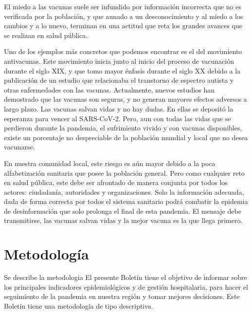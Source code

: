 \documentclass[12pt,a4paper,openany]{book}
\begin{document}
	El miedo a las vacunas suele ser infundido por información incorrecta que no es verificada por la población, y que aunado a un desconocimiento y al  miedo a los cambios y a lo nuevo, terminan en una actitud que reta los grandes avances que se realizan en salud pública.
	
	Uno de los ejemplos más concretos que podemos encontrar es el del movimiento antivacunas. Este movimiento inicia junto al inicio del proceso de vacunación durante el siglo XIX, y que tomo mayor énfasis durante el siglo XX debido a la publicación de un estudio que relacionaba el transtorno de espectro autista y otras enfermedades con las vacunas. Actualmente, nuevos estudios han demostrado que las vacunas son seguras, y no generan mayores efectos adversos a largo plazo.  Las vacunas salvan vidas y no hay dudas. En ellas se depositó la esperanza para vencer al SARS-CoV-2. Pero, aun con todas las vidas que se perdieron durante la pandemia, el sufrimiento vivido  y  con vacunas disponibles, existe un porcentaje no despreciable de la población mundial y local que no desea vacunarse. 
	
	
	En nuestra comunidad local, este riesgo es aún mayor debido a la poca alfabetización sanitaria que posee la población general. Pero como cualquier reto en salud pública, este debe ser afrontado de manera conjunta por todos los actores: ciudadanía, autoridades y organizaciones. Solo la información adecuada, dada de forma correcta por todos el sistema sanitario podrá combatir la epidemia de desinformación que solo prolonga el final de esta pandemia. El mensaje debe transmitirse, las vacunas salvan vidas y la mejor vacuna es la que llega primero.
	
	
	\clearpage
	
	\section*{Metodología}	
	Se describe la metodologia 
	\noindent El presente Boletín tiene el objetivo de informar sobre los principales indicadores epidemiológicos y de gestión hospitalaria,  para hacer el seguimiento de la pandemia en nuestra región y tomar mejores decisiones. Este Boletín tiene una metodología de tipo descriptiva. 
	
\end{document}
